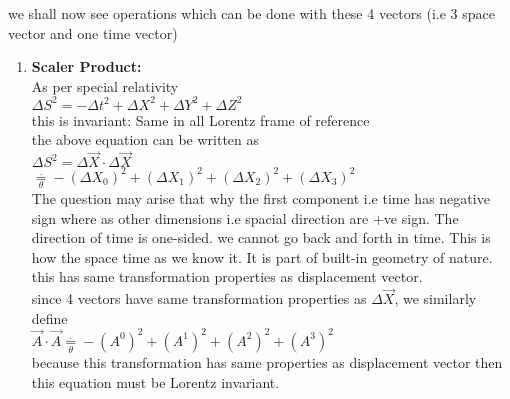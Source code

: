 \documentclass[11pt,a4paper]{article}
\begin{document}
\begin{enumerate}
\begin{enumerate}
		            we shall now see operations which can be done with these 4 vectors (i.e 3 space vector and one time vector)
		            \begin{enumerate}
			            \item \textbf{Scaler Product:}\\
			                  As per special relativity\\
			                  $\Delta{S^2}=-\Delta{t^2}+\Delta{X^2}+\Delta{Y^2}+\Delta{Z^2}$\\
			                  this is invariant: Same in all Lorentz frame of reference\\
			                  the above equation can be written as\\
			                  $\Delta{S^2} = \Delta \vec{X} \cdot \Delta\vec{X}$\\
			                  $\mathop = \limits^{.}_{\theta}  -(\Delta{X_0})^2+(\Delta{X_1})^2+(\Delta{X_2})^2+(\Delta{X_3})^2$\\
			                  The question may arise that why the first component i.e time has negative sign where as other dimensions i.e spacial direction are +ve sign. The direction of time is one-sided. we cannot go back and forth in time. This is how the space time as we know it. It is part of built-in geometry of nature.\\
			                  this has same transformation properties as displacement vector.\\
			                  since 4 vectors have same transformation properties as $\Delta \vec{X}$, we similarly define\\
			                  $\vec{A}\cdot\vec{A} \mathop = \limits^{.}_{\theta} - (A^0)^2 + (A^1)^2+ (A^2)^2+ (A^3)^2$\\
			                  because this transformation has same properties as displacement vector then this equation must be Lorentz invariant.


\end{enumerate}
\end{enumerate}
\end{enumerate}
\end{document}
